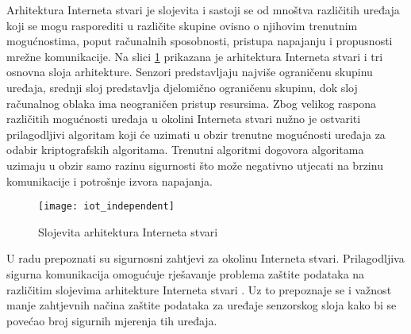 Arhitektura Interneta stvari je slojevita i sastoji se od mnoštva različitih
uređaja koji se mogu rasporediti u različite skupine ovisno o njihovim trenutnim
mogućnostima, poput računalnih sposobnosti, pristupa napajanju i propusnosti
mrežne komunikacije. Na slici \ref{fig:iot1} prikazana je arhitektura Interneta
stvari \cite{perera2014context} i tri
osnovna sloja arhitekture. Senzori predstavljaju najviše ograničenu
skupinu uređaja, srednji sloj predstavlja djelomično ograničenu skupinu, dok
sloj računalnog oblaka ima neograničen pristup resursima. Zbog velikog raspona
različitih mogućnosti uređaja u okolini Interneta stvari nužno je ostvariti
prilagodljivi algoritam koji će uzimati u obzir trenutne mogućnosti uređaja za
odabir kriptografskih algoritama. Trenutni algoritmi dogovora algoritama uzimaju
u obzir samo razinu sigurnosti što može negativno utjecati na brzinu
komunikacije i potrošnje izvora napajanja.

\begin{figure}[htb]
    \centering
    \texttt{[image: iot\_independent]}
    \caption{Slojevita arhitektura Interneta stvari}
    \label{fig:iot1}
\end{figure}

U radu \cite{Kapadia:2009:opportunistic} prepoznati su sigurnosni
zahtjevi za okolinu Interneta stvari. Prilagodljiva sigurna
komunikacija omogućuje rješavanje problema zaštite podataka na različitim
slojevima arhitekture Interneta stvari \cite{zhang:2011:architecture}. Uz to
prepoznaje se i važnost manje zahtjevnih načina zaštite podataka za uređaje
senzorskog sloja \cite{Suo} kako bi se povećao broj sigurnih mjerenja tih
uređaja. 

